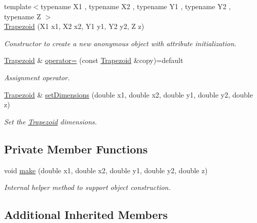 \begin{DoxyCompactItemize}
{\footnotesize template$<$typename X1 , typename X2 , typename Y1 , typename Y2 , typename Z $>$ }\\\hyperlink{class_d_d4hep_1_1_geometry_1_1_trapezoid_a378085e176651d02def815671ef757f6}{Trapezoid} (X1 x1, X2 x2, Y1 y1, Y2 y2, Z z)
\begin{DoxyCompactList}\small\item\em Constructor to create a new anonymous object with attribute initialization. \end{DoxyCompactList}\item 
\hyperlink{class_d_d4hep_1_1_geometry_1_1_trapezoid}{Trapezoid} \& \hyperlink{class_d_d4hep_1_1_geometry_1_1_trapezoid_a3313c5ca5dda01ef715981a44752ecf6}{operator=} (const \hyperlink{class_d_d4hep_1_1_geometry_1_1_trapezoid}{Trapezoid} \&copy)=default
\begin{DoxyCompactList}\small\item\em Assignment operator. \end{DoxyCompactList}\item 
\hyperlink{class_d_d4hep_1_1_geometry_1_1_trapezoid}{Trapezoid} \& \hyperlink{class_d_d4hep_1_1_geometry_1_1_trapezoid_ad36a96cf7a7fbcd3145ca664e2c8fa39}{set\+Dimensions} (double x1, double x2, double y1, double y2, double z)
\begin{DoxyCompactList}\small\item\em Set the \hyperlink{class_d_d4hep_1_1_geometry_1_1_trapezoid}{Trapezoid} dimensions. \end{DoxyCompactList}\end{DoxyCompactItemize}
\subsection*{Private Member Functions}
\begin{DoxyCompactItemize}
\item 
void \hyperlink{class_d_d4hep_1_1_geometry_1_1_trapezoid_ae6901e6e8639b330b5ecacff7c91792c}{make} (double x1, double x2, double y1, double y2, double z)
\begin{DoxyCompactList}\small\item\em Internal helper method to support object construction. \end{DoxyCompactList}\end{DoxyCompactItemize}
\subsection*{Additional Inherited Members}


